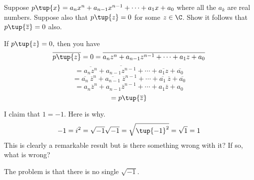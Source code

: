 \begin{enumialphparenastyle}
\begin{ex} \label{15julyprob2}Suppose $p\tup{x}
=a_{n}x^{n}+a_{n-1}x^{n-1}+\cdots +a_{1}x+a_{0}$ where all the $a_{k}$ are
real numbers. Suppose also that $p\tup{z} =0$ for some $z\in \C$. Show it follows that $p\tup{\overline{z}} =0$ also. 
\begin{sol}
If $p\tup{z} =0,$ then you have
\[
\overline{p\tup{z} }=0=\overline{a_{n}z^{n}+a_{n-1}z^{n-1}+\cdots
+a_{1}z+a_{0}}
\]
\[
=\overline{a_{n}z^{n}}+\overline{a_{n-1}z^{n-1}}+\cdots +\overline{a_{1}z}+
\overline{a_{0}}
\]
\[
=\overline{a_{n}}\ \overline{z}^{n}+\overline{a_{n-1}}\ \overline{z}
^{n-1}+\cdots +\overline{a_{1}}\ \overline{z}+\overline{a_{0}}
\]
\[
=a_{n}\overline{z}^{n}+a_{n-1}\overline{z}^{n-1}+\cdots +a_{1}\overline{z}
+a_{0}
\]
\[
=p\tup{\overline{z}}
\]
\end{sol}
\end{ex}

\begin{ex} I claim that $1=-1.$ Here is why.
\begin{equation*}
-1=i^{2}=\sqrt{-1}\sqrt{-1}=\sqrt{\tup{-1} ^{2}}=\sqrt{1}=1
\end{equation*}
This is clearly a remarkable result but is there something wrong with it? If
so, what is wrong? 
\begin{sol}
The problem is that there is no single $\sqrt{-1}$.
\end{sol}
\end{ex}

\end{enumialphparenastyle}
